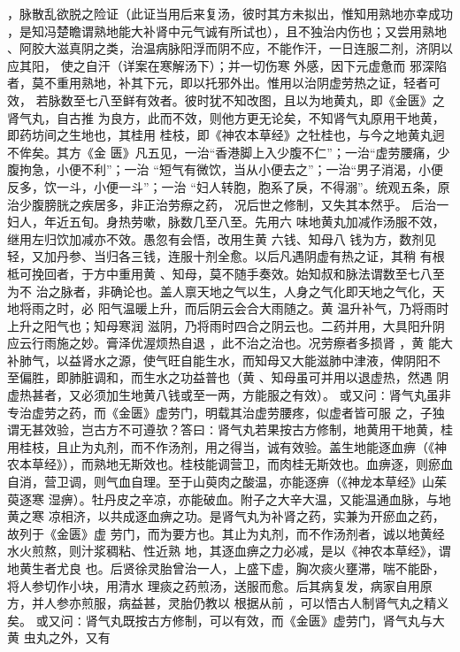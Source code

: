 \documentclass[a4paper,12pt,UTF8,twoside]{ctexbook}
\begin{document}
，脉散乱欲脱之险证（此证当用后来复汤，彼时其方未拟出，惟知用熟地亦幸成功 
，是知冯楚瞻谓熟地能大补肾中元气诚有所试也），且不独治内伤也；又尝用熟地 
、阿胶大滋真阴之类，治温病脉阳浮而阴不应，不能作汗，一日连服二剂，济阴以应其阳， 
使之自汗（详案在寒解汤下）；并一切伤寒 外感，因下元虚惫而 
邪深陷者，莫不重用熟地，补其下元，即以托邪外出。惟用以治阴虚劳热之证，轻者可效， 
若脉数至七八至鲜有效者。彼时犹不知改图，且以为地黄丸，即《金匮》之肾气丸，自古推 
为良方，此而不效，则他方更无论矣，不知肾气丸原用干地黄，即药坊间之生地也，其桂用 
桂枝，即《神农本草经》之牡桂也，与今之地黄丸迥不侔矣。其方《金 
匮》凡五见，一治“香港脚上入少腹不仁”；一治“虚劳腰痛，少腹拘急，小便不利”；一治 
“短气有微饮，当从小便去之”；一治“男子消渴，小便反多，饮一斗，小便一斗”；一治 
“妇人转胞，胞系了戾，不得溺”。统观五条，原治少腹膀胱之疾居多，非正治劳瘵之药， 
况后世之修制，又失其本然乎。 
后治一妇人，年近五旬。身热劳嗽，脉数几至八至。先用六 
味地黄丸加减作汤服不效，继用左归饮加减亦不效。愚忽有会悟，改用生黄 六钱、知母八 
钱为方，数剂见轻，又加丹参、当归各三钱，连服十剂全愈。以后凡遇阴虚有热之证，其稍 
有根柢可挽回者，于方中重用黄 、知母，莫不随手奏效。始知叔和脉法谓数至七八至为不 
治之脉者，非确论也。盖人禀天地之气以生，人身之气化即天地之气化，天地将雨之时，必 
阳气温暖上升，而后阴云会合大雨随之。黄 温升补气，乃将雨时上升之阳气也；知母寒润 
滋阴，乃将雨时四合之阴云也。二药并用，大具阳升阴应云行雨施之妙。膏泽优渥烦热自退 
，此不治之治也。况劳瘵者多损肾 
，黄 能大补肺气，以益肾水之源，使气旺自能生水，而知母又大能滋肺中津液，俾阴阳不 
至偏胜，即肺脏调和，而生水之功益普也（黄 、知母虽可并用以退虚热，然遇 
阴虚热甚者，又必须加生地黄八钱或至一两，方能服之有效）。 
或又问∶肾气丸虽非专治虚劳之药，而《金匮》虚劳门，明载其治虚劳腰疼，似虚者皆可服 
之，子独谓无甚效验，岂古方不可遵欤？答曰∶肾气丸若果按古方修制，地黄用干地黄，桂 
用桂枝，且止为丸剂，而不作汤剂，用之得当，诚有效验。盖生地能逐血痹（《神 
农本草经》），而熟地无斯效也。桂枝能调营卫，而肉桂无斯效也。血痹逐，则瘀血 
自消，营卫调，则气血自理。至于山萸肉之酸温，亦能逐痹（《神龙本草经》山茱萸逐寒 
湿痹）。牡丹皮之辛凉，亦能破血。附子之大辛大温，又能温通血脉，与地黄之寒 
凉相济，以共成逐血痹之功。是肾气丸为补肾之药，实兼为开瘀血之药，故列于《金匮》虚 
劳门，而为要方也。其止为丸剂，而不作汤剂者，诚以地黄经水火煎熬，则汁浆稠粘、性近熟 
地，其逐血痹之力必减，是以《神农本草经》，谓地黄生者尤良 
也。后贤徐灵胎曾治一人，上盛下虚，胸次痰火壅滞，喘不能卧，将人参切作小块，用清水 
理痰之药煎汤，送服而愈。后其病复发，病家自用原方，并人参亦煎服，病益甚，灵胎仍教以 
根据从前 
，可以悟古人制肾气丸之精义矣。 
或又问∶肾气丸既按古方修制，可以有效，而《金匮》虚劳门，肾气丸与大黄 虫丸之外，又有 
\end{document}
